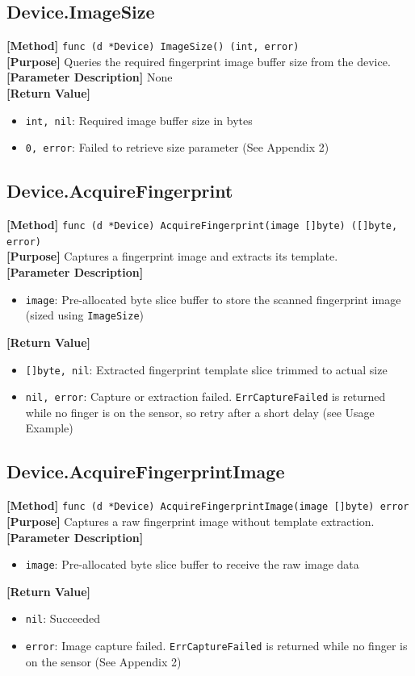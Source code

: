 \documentclass[11pt, a4paper]{article}
\begin{document}
\subsection{Device.ImageSize}
\textbf{[Method]} \texttt{func (d *Device) ImageSize() (int, error)} \\
\textbf{[Purpose]} Queries the required fingerprint image buffer size from the device. \\
\textbf{[Parameter Description]} None \\
\textbf{[Return Value]} 
\begin{itemize}
    \item \texttt{int, nil}: Required image buffer size in bytes
    \item \texttt{0, error}: Failed to retrieve size parameter (See Appendix 2)
\end{itemize}

\subsection{Device.AcquireFingerprint}
\textbf{[Method]} \texttt{func (d *Device) AcquireFingerprint(image []byte) ([]byte, error)} \\
\textbf{[Purpose]} Captures a fingerprint image and extracts its template. \\
\textbf{[Parameter Description]} 
\begin{itemize}
    \item \texttt{image}: Pre-allocated byte slice buffer to store the scanned fingerprint image (sized using \texttt{ImageSize})
\end{itemize}
\textbf{[Return Value]} 
\begin{itemize}
    \item \texttt{[]byte, nil}: Extracted fingerprint template slice trimmed to actual size
    \item \texttt{nil, error}: Capture or extraction failed. \texttt{ErrCaptureFailed} is returned while no finger is on the sensor, so retry after a short delay (see Usage Example)
\end{itemize}

\subsection{Device.AcquireFingerprintImage}
\textbf{[Method]} \texttt{func (d *Device) AcquireFingerprintImage(image []byte) error} \\
\textbf{[Purpose]} Captures a raw fingerprint image without template extraction. \\
\textbf{[Parameter Description]} 
\begin{itemize}
    \item \texttt{image}: Pre-allocated byte slice buffer to receive the raw image data
\end{itemize}
\textbf{[Return Value]} 
\begin{itemize}
    \item \texttt{nil}: Succeeded
    \item \texttt{error}: Image capture failed. \texttt{ErrCaptureFailed} is returned while no finger is on the sensor (See Appendix 2)
\end{itemize}
\end{document}
